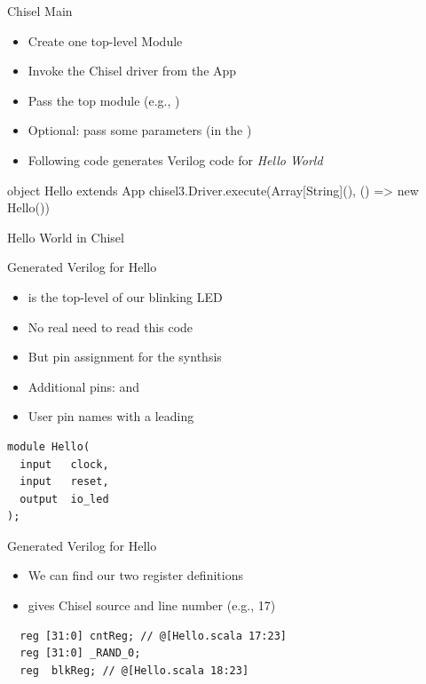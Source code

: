 \begin{frame}[fragile]{Chisel Main}

\begin{itemize}
\item Create one top-level Module
\item Invoke the Chisel driver from the App
\item Pass the top module (e.g., )
\item Optional: pass some parameters (in the )
\item Following code generates Verilog code for \emph{Hello World}
\end{itemize}
\begin{chisel}
object Hello extends App {
  chisel3.Driver.execute(Array[String](), () => new Hello())
}
\end{chisel}
\end{frame}

\begin{frame}[fragile]{Hello World in Chisel}
\end{frame}



\begin{frame}[fragile]{Generated Verilog for Hello}
\begin{itemize}
\item {} is the top-level of our blinking LED
\item No real need to read this code
\item But pin assignment for the synthsis
\item Additional pins:  and 
\item User pin names with a leading 
\end{itemize}
\begin{verbatim}
module Hello(
  input   clock,
  input   reset,
  output  io_led
);
\end{verbatim}
\end{frame}

\begin{frame}[fragile]{Generated Verilog for Hello}
\begin{itemize}
\item We can find our two register definitions
\item {} gives Chisel source and line number (e.g., 17)
\end{itemize}
\begin{verbatim}
  reg [31:0] cntReg; // @[Hello.scala 17:23]
  reg [31:0] _RAND_0;
  reg  blkReg; // @[Hello.scala 18:23]
\end{verbatim}
\end{frame}

